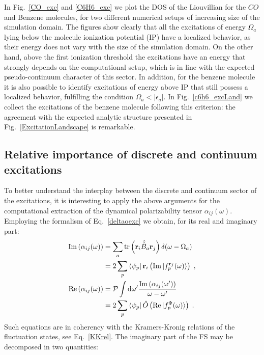 \documentclass[reprint,aps,prb]{revtex4-1}
\newcommand{\dd}{{\rm d}}
\newcommand{\eps}{\epsilon}
\newcommand{\op}[1]{\hat {#1}}
\newcommand{\sop}[1]{\op{\op {#1}}}
\newcommand{\trace}[1]{\mathrm{tr}\left(#1\right)}
\begin{document}
In Fig.~\ref{CO_exc} and \ref{C6H6_exc} we plot the DOS of the Liouvillian for the $CO$  and Benzene molecules,
for two different numerical setups of increasing size of the simulation domain.
The figures show clearly that all the excitations of energy $\Omega_a$ lying below the
molecule ionization potential (IP) have a localized behavior, as their energy does not vary with the size of the simulation domain.
On the other hand, above the first ionization threshold the excitations have an energy that strongly depends on the computational
setup, which is in line with the expected pseudo-continuum character of this sector.
In addition, for the benzene molecule it is also possible to
identify excitations of energy above IP that still possess a localized behavior, fulfilling the condition $\Omega_a < |\eps_a|$.
In Fig.~\ref{c6h6_excLand} we collect the excitations of the benzene molecule following this criterion:
the agreement with the expected analytic structure presented in Fig.~\ref{ExcitationLandscape} is remarkable.


\subsection{Relative importance of discrete and continuum excitations}

To better understand the interplay between the discrete and continuum sector of
the excitations, it is interesting to apply the above arguments for the computational extraction of the dynamical polarizability tensor $\alpha_{ij}(\omega)$.
Employing the formalism of Eq.~\eqref{deltaoexc} we obtain, for its real and imaginary part:
\begin{align}
  \mathrm{Im}\left(\alpha_{ij}(\omega) \right) &=
  \sum_{a} \trace{\mathbf r_i \sop B_a \mathbf r_j} \delta(\omega - \Omega_a)\\
   &= 2 \sum_p \bra{\psi_p} \mathbf r_i \left(\mathrm{Im}\ket{f_p^{\mathbf r_j}(\omega)}\right)\;,\\
  \mathrm{Re}\left(\alpha_{ij}(\omega) \right) &= \mathcal P \int \dd \omega'
  \frac{\mathrm{Im}\left(\alpha_{ij}(\omega')\right)}{\omega - \omega'} \\
  & =2 \sum_p \bra{\psi_p} \op O \left(\mathrm{Re}\ket{f_p^\Phi(\omega)}\right)\;.
\end{align}
Such equations are in coherency with the Kramers-Kronig relations of the fluctuation states, see Eq.~\eqref{KKrel}.
The imaginary part of the FS may be decomposed in two quantities:
\end{document}
